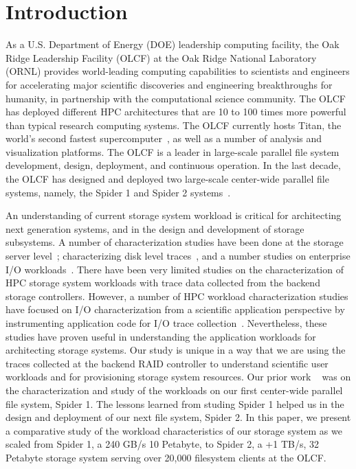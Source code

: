 \section{Introduction}
\label{sec:intro}

As a U.S. Department of Energy (DOE) leadership computing facility, the Oak
Ridge Leadership Facility (OLCF) at the Oak Ridge National Laboratory (ORNL)
provides world-leading computing capabilities to scientists and engineers for
accelerating major scientific discoveries and engineering breakthroughs for
humanity, in partnership with the computational science community. The OLCF has
deployed different HPC architectures that are 10 to 100 times more powerful
than typical research computing systems. The OLCF currently hosts Titan, the
world's second fastest supercomputer~\cite{titan}, as well as a
number of analysis and visualization platforms. The OLCF is a leader in large-scale
parallel file system development, design, deployment, and continuous operation. In the
last decade, the OLCF has designed and deployed two large-scale center-wide
parallel file systems, namely, the Spider 1 and Spider 2 systems~\cite{spider1,
spider2}.

An understanding of current storage system workload is critical for
architecting next generation systems, and in the design and development of
storage subsystems. A number of characterization studies have been done at the
storage server level~\cite{hpca04:zhang, iiswc08:swaroop}; characterizing disk level
traces~\cite{ sigmetrics09:alma}, and a number studies on enterprise I/O
workloads~\cite{gmach2007workload, hpca04:zhang}. There have been very limited
studies on the characterization of HPC storage system workloads with trace
data collected from the backend storage controllers. However, a number of HPC
workload characterization studies have focused on I/O characterization from a
scientific application perspective by instrumenting application code for I/O
trace collection~\cite{Carns:2011, shan2008characterizing}. Nevertheless,
these studies have proven useful in understanding the application workloads
for architecting storage systems. Our study is unique in a way that we are
using the traces collected at the backend RAID controller to understand
scientific user workloads and for provisioning storage system resources. Our
prior work ~\cite{ spider1-workload} was on the characterization and study of
the workloads on our first center-wide parallel file system, Spider 1. The
lessons learned from studing Spider 1 helped us in the design and deployment of our
next file system, Spider 2. In this paper, we present a comparative study of
the workload characteristics of our storage system as we scaled from Spider 1,
a 240 GB/s 10 Petabyte, to Spider 2, a +1 TB/s, 32 Petabyte storage system
serving over 20,000 filesystem clients at the OLCF.

